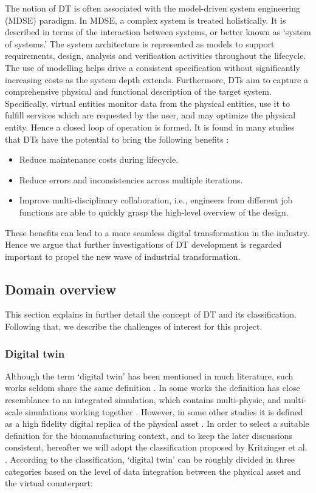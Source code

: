 \documentclass[journal,onecolumn]{IEEEtran} %
\begin{document}
The notion of DT is often associated with the model-driven system engineering (MDSE) paradigm. In MDSE, a complex system is treated holistically. It is described in terms of the interaction between systems, or better known as `system of systems.' The system architecture is represented as models to support requirements, design, analysis and verification activities throughout the lifecycle. The use of modelling helps drive a consistent specification without significantly increasing costs as the system depth extends. Furthermore, DTs aim to capture a comprehensive physical and functional description of the target system. Specifically, virtual entities monitor data from the physical entities, use it to fulfill services which are requested by the user, and may optimize the physical entity. Hence a closed loop of operation is formed. It is found in many studies that DTs have the potential to bring the following benefits \cite{Boschert2016, Macchi2018, Lim2019, Ansari2020, Cai2021, Gurdur2022}:
\begin{itemize}
  \item Reduce maintenance costs during lifecycle.
  \item Reduce errors and inconsistencies across multiple iterations. 
  \item Improve multi-disciplinary collaboration, i.e., engineers from different job functions are able to quickly grasp the high-level overview of the design.
\end{itemize}

These benefits can lead to a more seamless digital transformation in the industry. Hence we argue that further investigations of DT development is regarded important to propel the new wave of industrial transformation. 

\subsection{Domain overview}\label{sec:overview}
This section explains in further detail the concept of DT and its classification. Following that, we describe the challenges of interest for this project.
\subsubsection{Digital twin}\label{sec:dt}
Although the term `digital twin' has been mentioned in much literature, such works seldom share the same definition \cite{Liu2021}. In some works the definition has close resemblance to an integrated simulation, which contains multi-physic, and multi-scale simulations working together \cite{Shafto2012}. However, in some other studies it is defined as a high fidelity digital replica of the physical asset \cite{Schluse2018}. In order to select a suitable definition for the biomanufacturing context, and to keep the later discussions consistent, hereafter we will adopt the classification proposed by Kritzinger et al. \cite{Kritzinger2018}. According to the classification, `digital twin' can be roughly divided in three categories based on the level of data integration between the physical asset and the virtual counterpart:
\end{document}
